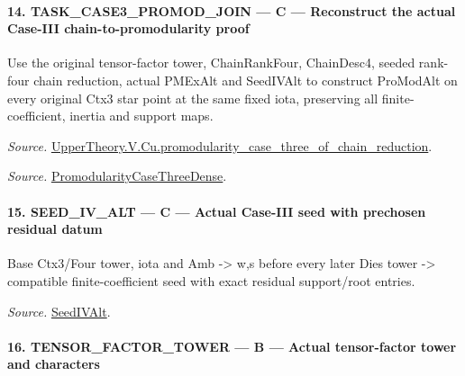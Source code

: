 \paragraph{14. TASK\_\allowbreak CASE3\_\allowbreak PROMOD\_\allowbreak JOIN — C — Reconstruct the actual Case-III chain-to-promodularity proof}

Use the original tensor-factor tower, ChainRankFour, ChainDesc4, seeded rank-four chain reduction, actual PMExAlt and SeedIVAlt to construct ProModAlt on every original Ctx3 star point at the same fixed iota, preserving all finite-coefficient, inertia and support maps.

\emph{Source.} \href{https://github.com/CocoSgt/riemann-hypothesis-lean/blob/7cbf7a0c32fca1badf05931879a37c3f8a2b03b4/src/Development/AutomorphicArithmetic/AutomorphicVarieties/ModularityArgument/ThresholdArguments/DenseThresholdCases/PromodularityCaseThreeOfLemmas.lean#L131-L153}{UpperTheory.V.Cu.promodularity\_\allowbreak case\_\allowbreak three\_\allowbreak of\_\allowbreak chain\_\allowbreak reduction}.

\emph{Source.} \href{https://github.com/CocoSgt/riemann-hypothesis-lean/blob/7cbf7a0c32fca1badf05931879a37c3f8a2b03b4/src/Development/AutomorphicArithmetic/AutomorphicVarieties/ModularityArgument/ThresholdArguments/DenseThresholdCases/PromodularityCaseThree.lean#L40-L42}{PromodularityCaseThreeDense}.



\paragraph{15. SEED\_\allowbreak IV\_\allowbreak ALT — C — Actual Case-III seed with prechosen residual datum}

Base Ctx3/Four tower, iota and Amb -> w,s before every later Dies tower -> compatible finite-coefficient seed with exact residual support/root entries.

\emph{Source.} \href{https://github.com/CocoSgt/riemann-hypothesis-lean/blob/7cbf7a0c32fca1badf05931879a37c3f8a2b03b4/src/Development/AutomorphicArithmetic/AutomorphicVarieties/ModularityArgument/ThresholdArguments/DenseThresholdCases/PromodularityCaseThree.lean#L19-L25}{SeedIVAlt}.



\paragraph{16. TENSOR\_\allowbreak FACTOR\_\allowbreak TOWER — B — Actual tensor-factor tower and characters}


